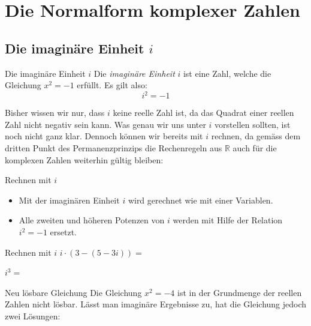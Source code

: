 \section{Die Normalform komplexer Zahlen}
\subsection{Die imaginäre Einheit \texorpdfstring{$i$}{i}}


\begin{definition}{Die imaginäre Einheit $i$}{}
Die \textit{imaginäre Einheit} $i$ ist eine Zahl, welche die Gleichung $x^2=-1$ erfüllt. Es gilt also: 
$$i^2=-1$$
\end{definition}

Bisher wissen wir nur, dass $i$ keine reelle Zahl ist, da das Quadrat einer reellen Zahl nicht negativ sein kann. Was genau wir uns unter $i$ vorstellen sollten, ist noch nicht ganz klar. Dennoch können wir bereits mit $i$ rechnen, da gemäss dem dritten Punkt des Permanenzprinzips die Rechenregeln aus $\mathbb{R}$ auch für die komplexen Zahlen weiterhin gültig bleiben:



\begin{satz}{Rechnen mit $i$}{}
    \begin{itemize}
        \item Mit der imaginären Einheit $i$ wird gerechnet wie mit einer Variablen.
        \item Alle zweiten und höheren Potenzen von $i$ werden mit Hilfe der Relation $i^2 = -1$ ersetzt.
    \end{itemize}
    \end{satz}

    \begin{bsp}{Rechnen mit $i$}{}
        $i \cdot (3 - (5-3i)) = $

        \vspace*{1cm}

        $i^3 = $
    \end{bsp}

    \begin{bsp}
    {Neu lösbare Gleichung}{}
    Die Gleichung $x^2 = -4$ ist in der Grundmenge der reellen Zahlen nicht lösbar. Lässt man imaginäre Ergebnisse zu, hat die Gleichung jedoch zwei Lösungen:

    \vspace*{2cm}


    \end{bsp}

